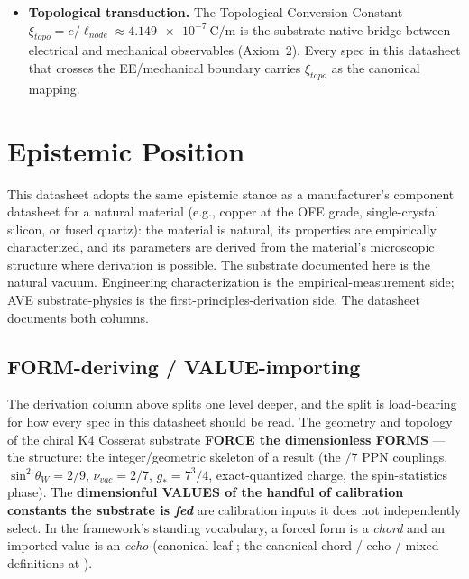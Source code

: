 \begin{itemize}
    \item \textbf{Topological transduction.} The Topological Conversion Constant $\xi_{topo} = e/\ell_{node} \approx \qty{4.149e-7}{\coulomb\per\metre}$ is the substrate-native bridge between electrical and mechanical observables (Axiom~2). Every spec in this datasheet that crosses the EE/mechanical boundary carries $\xi_{topo}$ as the canonical mapping.
\end{itemize}

\section{Epistemic Position}
\label{sec:vol9_epistemic_position}

This datasheet adopts the same epistemic stance as a manufacturer's component datasheet for a natural material (e.g., copper at the OFE grade, single-crystal silicon, or fused quartz): the material is natural, its properties are empirically characterized, and its parameters are derived from the material's microscopic structure where derivation is possible. The substrate documented here is the natural vacuum. Engineering characterization is the empirical-measurement side; AVE substrate-physics is the first-principles-derivation side. The datasheet documents both columns.

\subsection{FORM-deriving / VALUE-importing}
\label{subsec:vol9_form_vs_value}

The derivation column above splits one level deeper, and the split is load-bearing for how every spec in this datasheet should be read. The geometry and topology of the chiral K4 Cosserat substrate \textbf{FORCE the dimensionless FORMS} --- the structure: the integer/geometric skeleton of a result (the $/7$ PPN couplings, $\sin^2\theta_W = 2/9$, $\nu_{vac} = 2/7$, $g_* = 7^3/4$, exact-quantized charge, the spin-statistics phase). The \textbf{dimensionful VALUES of the handful of calibration constants the substrate is \emph{fed}} are calibration inputs it does not independently select. In the framework's standing vocabulary, a forced form is a \emph{chord} and an imported value is an \emph{echo} (canonical leaf ; the canonical chord / echo / mixed definitions at ).

